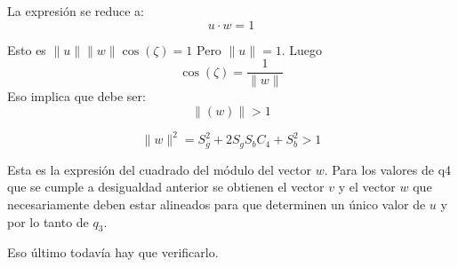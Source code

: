 \documentclass[a4paper,12pt]{article}
\begin{document}
La expresión se reduce a:
\[u \cdot w = 1\]

Esto es $\parallel u \parallel \parallel w \parallel \cos(\zeta) = 1$
Pero $\parallel u \parallel  = 1$. Luego
\[
    \cos(\zeta) = \frac{1}{\parallel w \parallel}
\]
Eso implica que debe ser:
\[
    \parallel(w) \parallel > 1
\]

\[
\|w\|^2 = S_g^2 + 2S_g S_b C_4 + S_b^2 > 1
\]

Esta es la expresión del cuadrado del módulo del vector \( w \).
Para los valores de q4 que se cumple a desigualdad anterior se obtienen
el vector $v$ y el vector $w$ que necesariamente deben estar alineados para que
determinen un único valor de $u$ y por lo tanto de $q_3$.

Eso último todavía hay que verificarlo.



\end{document}
